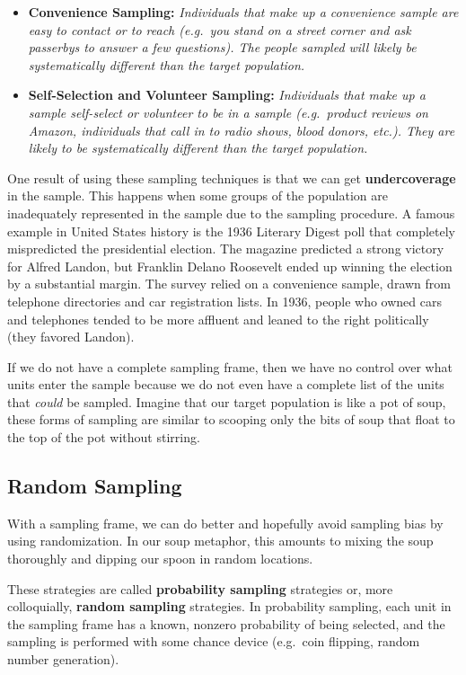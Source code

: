 \documentclass[
]{book}
\begin{document}
\begin{itemize}
\item
  \textbf{Convenience Sampling:} \emph{Individuals that make up a convenience sample are easy to contact or to reach (e.g.~you stand on a street corner and ask passerbys to answer a few questions). The people sampled will likely be systematically different than the target population.}
\item
  \textbf{Self-Selection and Volunteer Sampling:} \emph{Individuals that make up a sample self-select or volunteer to be in a sample (e.g.~product reviews on Amazon, individuals that call in to radio shows, blood donors, etc.). They are likely to be systematically different than the target population.}
\end{itemize}

One result of using these sampling techniques is that we can get \textbf{undercoverage} in the sample. This happens when some groups of the population are inadequately represented in the sample due to the sampling procedure. A famous example in United States history is the 1936 Literary Digest poll that completely mispredicted the presidential election. The magazine predicted a strong victory for Alfred Landon, but Franklin Delano Roosevelt ended up winning the election by a substantial margin. The survey relied on a convenience sample, drawn from telephone directories and car registration lists. In 1936, people who owned cars and telephones tended to be more affluent and leaned to the right politically (they favored Landon).

If we do not have a complete sampling frame, then we have no control over what units enter the sample because we do not even have a complete list of the units that \emph{could} be sampled. Imagine that our target population is like a pot of soup, these forms of sampling are similar to scooping only the bits of soup that float to the top of the pot without stirring.

\subsection{Random Sampling}\label{random-sampling}

With a sampling frame, we can do better and hopefully avoid sampling bias by using randomization. In our soup metaphor, this amounts to mixing the soup thoroughly and dipping our spoon in random locations.

These strategies are called \textbf{probability sampling} strategies or, more colloquially, \textbf{random sampling} strategies. In probability sampling, each unit in the sampling frame has a known, nonzero probability of being selected, and the sampling is performed with some chance device (e.g.~coin flipping, random number generation).
\end{document}
